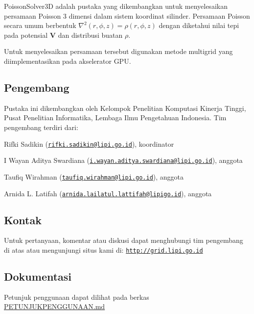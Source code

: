 Poisson\+Solver3D adalah pustaka yang dikembangkan untuk menyelesaikan persamaan Poisson 3 dimensi dalam sistem koordinat silinder. Persamaan Poisson secara umum berbentuk $\nabla^{2}(r,\phi,z) = \rho(r,\phi,z)$ dengan diketahui nilai tepi pada potensial $\mathbf{V}$ dan distribusi buatan $\rho$.

Untuk menyelesaikan persamaan tersebut digunakan metode multigrid yang diimplementasikan pada akselerator G\+PU.

\subsection*{Pengembang}

Pustaka ini dikembangkan oleh Kelompok Penelitian Komputasi Kinerja Tinggi, Pusat Penelitian Informatika, Lembaga Ilmu Pengetahuan Indonesia. Tim pengembang terdiri dari\+:


\begin{DoxyItemize}
\item Rifki Sadikin (\href{mailto:rifki.sadikin@lipi.go.id}{\tt rifki.\+sadikin@lipi.\+go.\+id}), koordinator
\item I Wayan Aditya Swardiana (\href{mailto:i.wayan.aditya.swardiana@lipi.go.id}{\tt i.\+wayan.\+aditya.\+swardiana@lipi.\+go.\+id}), anggota
\item Taufiq Wirahman (\href{mailto:taufiq.wirahman@lipi.go.id}{\tt taufiq.\+wirahman@lipi.\+go.\+id}), anggota
\item Arnida L. Latifah (\href{mailto:arnida.lailatul.lattifah@lipigo.id}{\tt arnida.\+lailatul.\+lattifah@lipigo.\+id}), anggota \subsection*{Kontak}
\end{DoxyItemize}

Untuk pertanyaan, komentar atau diskusi dapat menghubungi tim pengembang di atas atau mengunjungi situs kami di\+: \href{http://grid.lipi.go.id}{\tt http\+://grid.\+lipi.\+go.\+id}

\subsection*{Dokumentasi}

Petunjuk penggunaan dapat dilihat pada berkas \hyperlink{PETUNJUKPENGGUNAAN_8md_source}{P\+E\+T\+U\+N\+J\+U\+K\+P\+E\+N\+G\+G\+U\+N\+A\+AN.md} 